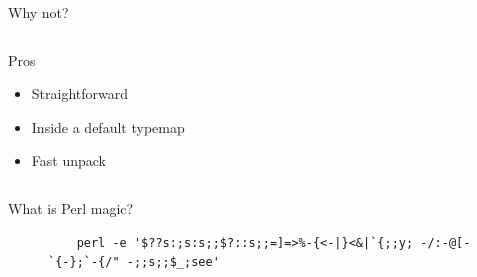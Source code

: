 \documentclass[mathserif,hyperref={urlcolor=cyan,colorlinks=true}]{beamer}
\begin{document}
\begin{frame}{Why not?}
    \begin{columns}[c]
        \begin{exampleblock}{Pros}
        \begin{itemize}
            \item Straightforward
            \item Inside a default typemap
            \item Fast unpack
        \end{itemize}
        \end{exampleblock}
    \end{columns}
\end{frame}

\begin{frame}[fragile]{What is Perl magic?}
\begin{figure}
\begin{center}
{\bf
{\tiny
    \begin{verbatim}
    perl -e '$??s:;s:s;;$?::s;;=]=>%-{<-|}<&|`{;;y; -/:-@[-`{-};`-{/" -;;s;;$_;see'
    \end{verbatim}
}
}
\end{center}
\end{figure}
\end{frame}
\end{document}
